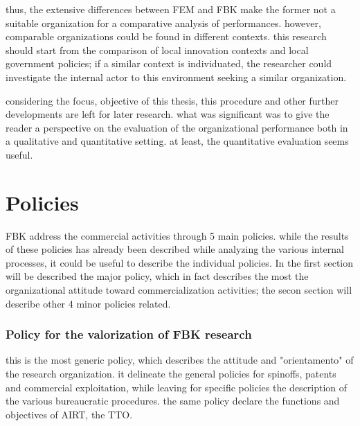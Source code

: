 thus, the extensive differences between FEM and FBK make the former not a suitable organization for a comparative analysis of performances. however, comparable organizations could be found in different contexts. this research should start from the comparison of local innovation contexts and local government policies; if a similar context is individuated, the researcher could investigate the internal actor to this environment seeking a similar organization. 

considering the focus, objective of this thesis, this procedure and other further developments are left for later research. what was significant was to give the reader a perspective on the evaluation of the organizational performance both in a qualitative and quantitative setting. at least, the quantitative evaluation seems useful.

\section{Policies}

FBK address the commercial activities through 5 main policies. while the results of these policies has already been described while analyzing the various internal processes, it could be useful to describe the individual policies. In the first section will be described the major policy, which in fact describes the most the organizational attitude toward commercialization activities; the secon section will describe other 4 minor policies related.

\subsubsection{Policy for the valorization of FBK research}

this is the most generic policy, which describes the attitude and "orientamento" of the research organization. it delineate the general policies for spinoffs, patents and commercial exploitation, while leaving for specific policies the description of the various bureaucratic procedures. the same policy declare the functions and objectives of AIRT, the TTO.

